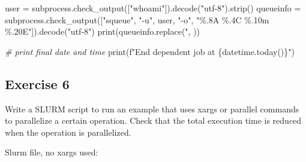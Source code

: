 \documentclass[]{article}
\newenvironment{Shaded}{\begin{snugshade}}{\end{snugshade}}
\newcommand{\BuiltInTok}[1]{#1}
\newcommand{\CommentTok}[1]{\textcolor[rgb]{0.56,0.35,0.01}{\textit{#1}}}
\newcommand{\ExtensionTok}[1]{#1}
\newcommand{\FunctionTok}[1]{\textcolor[rgb]{0.00,0.00,0.00}{#1}}
\newcommand{\KeywordTok}[1]{\textcolor[rgb]{0.13,0.29,0.53}{\textbf{#1}}}
\newcommand{\NormalTok}[1]{#1}
\newcommand{\OperatorTok}[1]{\textcolor[rgb]{0.81,0.36,0.00}{\textbf{#1}}}
\newcommand{\OtherTok}[1]{\textcolor[rgb]{0.56,0.35,0.01}{#1}}
\newcommand{\StringTok}[1]{\textcolor[rgb]{0.31,0.60,0.02}{#1}}
\newcommand{\VariableTok}[1]{\textcolor[rgb]{0.00,0.00,0.00}{#1}}
\begin{document}
\begin{Shaded}
\begin{Highlighting}[]
\ExtensionTok{user}\NormalTok{ = subprocess.check\_output([}\StringTok{"whoami"}\NormalTok{])}\ExtensionTok{.decode}\NormalTok{(}\StringTok{"utf{-}8"}\NormalTok{)}\ExtensionTok{.strip}\NormalTok{()}
\ExtensionTok{queueinfo}\NormalTok{ = subprocess.check\_output([}\StringTok{"squeue"}\NormalTok{, }\StringTok{"{-}u"}\NormalTok{, user, }\StringTok{"{-}o"}\NormalTok{, }\StringTok{\textquotesingle{}"\%.8A \%.4C \%.10m \%.20E"\textquotesingle{}}\NormalTok{])}\ExtensionTok{.decode}\NormalTok{(}\StringTok{"utf{-}8"}\NormalTok{)}
\ExtensionTok{print}\NormalTok{(queueinfo.replace(}\StringTok{\textquotesingle{}"\textquotesingle{}}\NormalTok{, }\StringTok{\textquotesingle{}\textquotesingle{}}\NormalTok{))}

\CommentTok{\# print final date and time}
\ExtensionTok{print}\NormalTok{(f}\StringTok{"End dependent job at \{datetime.today()\}"}\NormalTok{)}
\end{Highlighting}
\end{Shaded}

\hypertarget{exercise-6}{%
\subsection{Exercise 6}\label{exercise-6}}

Write a SLURM script to run an example that uses xargs or parallel
commands to parallelize a certain operation. Check that the total
execution time is reduced when the operation is parallelized.

Slurm file, no xargs used:

\begin{Shaded}
\end{Shaded}
\end{document}
